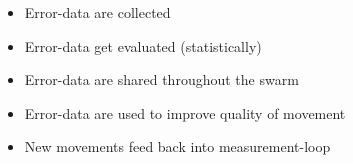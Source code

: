 \begin{itemize}
	\item{Error-data are collected}
	\item{Error-data get evaluated (statistically)}
	\item{Error-data are shared throughout the swarm}
	\item{Error-data are used to improve quality of movement}
	\item{New movements feed back into measurement-loop}
\end{itemize}